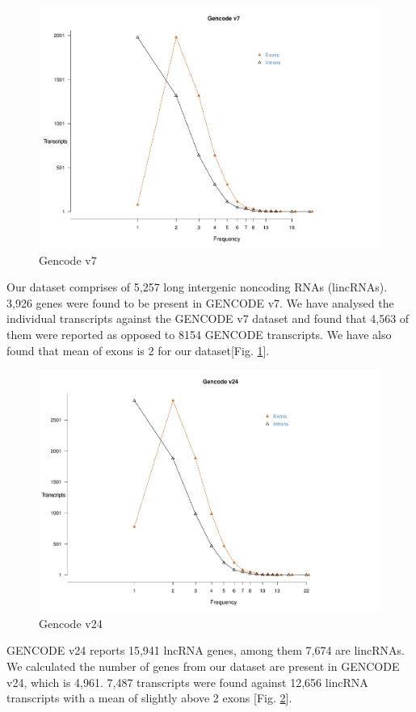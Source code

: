 \documentclass[ncrna,article,submit,moreauthors,pdftex,10pt,a4paper]{mdpi}
\begin{document}
 \begin{figure}[h]
  \centering
  \includegraphics[width=\linewidth]{Gencode_v7_replot.pdf}
  \caption{Gencode v7}
  \label{f1}
 \end{figure}

Our dataset comprises of 5,257 long intergenic noncoding RNAs (lincRNAs). 3,926 genes were found to be present in GENCODE v7. We have analysed the individual transcripts against the GENCODE v7 dataset and found that 4,563 of them were reported as opposed to 8154 GENCODE transcripts. We have also found that mean of exons is 2 for our dataset[Fig. \ref{f1}].

 \begin{figure}
  \centering
  \includegraphics[width=\linewidth]{Gencode_v24_replot.pdf}
  \caption{Gencode v24}
  \label{f2} 
 \end{figure}
 
GENCODE v24 reports 15,941 lncRNA genes, among them 7,674 are lincRNAs. We calculated the number of genes from our dataset are present in GENCODE v24, which is 4,961. 7,487 transcripts were found against 12,656 lincRNA transcripts with a mean of slightly above 2 exons [Fig. \ref{f2}].
\end{document}
